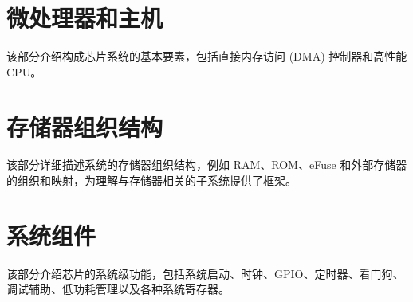\documentclass[openany, 10pt]{book}
\begin{document}
\setchineseformatting




\clearpage

\clearpage


\tableofcontents
\clearpage
\listoftables
\clearpage
\listoffigures






\part{微处理器和主机}


该部分介绍构成芯片系统的基本要素，包括直接内存访问 (DMA) 控制器和高性能 CPU。


\part{存储器组织结构}

该部分详细描述系统的存储器组织结构，例如 RAM、ROM、eFuse 和外部存储器的组织和映射，为理解与存储器相关的子系统提供了框架。


\part{系统组件}


该部分介绍芯片的系统级功能，包括系统启动、时钟、GPIO、定时器、看门狗、调试辅助、低功耗管理以及各种系统寄存器。

\end{document}
